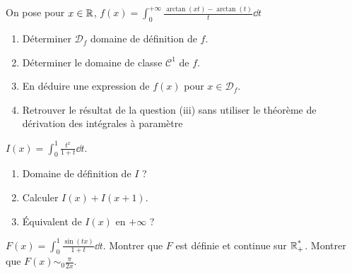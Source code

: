 \begin{exo}
	\label{intgen1}
	On pose pour $x\in\operatorname{\mathbb R}$, $f(x)=\int_0^{+\infty}\frac{\arctan(xt)-\arctan(t)}t\dd t$
	\begin{enumerate}
		\item Déterminer $\mathcal D_f$ domaine de définition de $f$.
		\item Déterminer le domaine de classe $\mathcal C^1$ de $f$.
		\item En déduire une expression de $f(x)$ pour $x\in\mathcal D_f$.
		\item Retrouver le résultat de la question (iii) sans utiliser le théorème de dérivation des intégrales à paramètre\\
	\end{enumerate}
\end{exo}

\begin{exo}
	\label{intgen2}
	$I(x)=\int_0^1\frac{t^x}{1+t}\dd t$.
	\begin{enumerate}
		\item Domaine de définition de $I$ ?
		\item Calculer $I(x) + I(x + 1)$.
		\item Équivalent de $I(x)$ en $+\infty$ ?
	\end{enumerate}
\end{exo}

\begin{exo}
	\label{intgen3}
	$F(x) = \int_0^1\frac{\sin(tx)}{1+t}\dd t$. Montrer que $F$ est définie et continue sur $\operatorname{\mathbb R_+^*}$. Montrer que $F(x)\sim_0\frac\pi{2x}$.
\end{exo}


